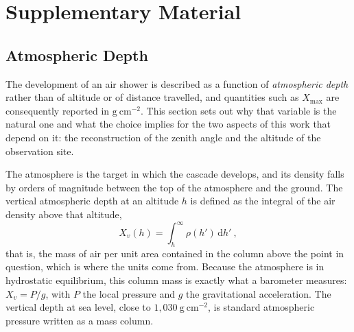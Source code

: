 \chapter{Supplementary Material} \label{ch:appendix}

\section{Atmospheric Depth} \label{sec:apx_depth}

The development of an air shower is described as a function of \textit{atmospheric depth} rather than of altitude or of distance travelled, and quantities such as $X_{\text{max}}$ are consequently reported in $\mathrm{g \ cm}^{-2}$. This section sets out why that variable is the natural one and what the choice implies for the two aspects of this work that depend on it: the reconstruction of the zenith angle and the altitude of the observation site.

The atmosphere is the target in which the cascade develops, and its density falls by orders of magnitude between the top of the atmosphere and the ground. The vertical atmospheric depth at an altitude $h$ is defined as the integral of the air density above that altitude,
\begin{equation}
    X_v(h) = \int_h^{\infty} \rho(h') \, \mathrm{d}h' \ ,
    \label{eq:atmospheric_depth}
\end{equation}
that is, the mass of air per unit area contained in the column above the point in question, which is where the units come from. Because the atmosphere is in hydrostatic equilibrium, this column mass is exactly what a barometer measures: $X_v = P/g$, with $P$ the local pressure and $g$ the gravitational acceleration. The vertical depth at sea level, close to $1{,}030 \ \mathrm{g \ cm}^{-2}$, is standard atmospheric pressure written as a mass column.

